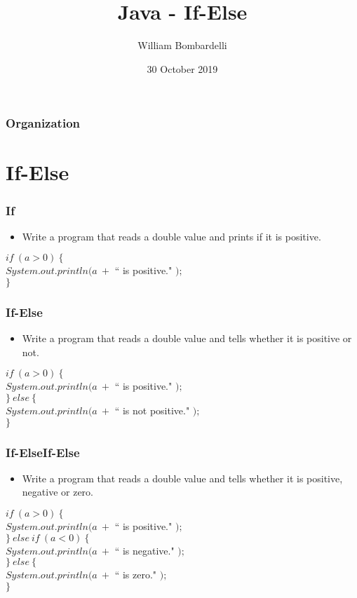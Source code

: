 \documentclass{beamer}
\title[Java]{Java - If-Else}
\author[W. Bombardelli]{William Bombardelli}
\institute[Schweizerschule Mexiko]
{
	\vskip 12pt
	Schweizerschule Mexiko, Ciudad de México, Mexico \\
	\texttt{\url{https://github.com/wbombardellis/java-unterricht}}
}
\date{30 October 2019}
\newcommand{\cindent}{\hskip20pt}
\begin{document}
	\begin{frame}
		\titlepage
	\end{frame}
	
	\begin{frame}
		\frametitle{Organization}
		\tableofcontents
	\end{frame}

	\section{If-Else}
	\begin{frame}
		\frametitle{If}
		\begin{itemize}
			\item Write a program that reads a double value and prints if it is positive.
		\end{itemize}
		\pause
		$if\ (a > 0)\ \{$\\
		\cindent $System.out.println(a\ + $ `` is positive." $);$\\
		$\}$\\
	\end{frame}

	\begin{frame}
		\frametitle{If-Else}
		\begin{itemize}
			\item Write a program that reads a double value and tells whether it is positive or not.
		\end{itemize}
		$if\ (a > 0)\ \{$\\
		\cindent $System.out.println(a\ + $ `` is positive." $);$\\
		$\}\ else\ \{$\\
		\cindent $System.out.println(a\ + $ `` is not positive." $);$\\
		$\}$\\
	\end{frame}

	\begin{frame}
		\frametitle{If-ElseIf-Else}
		\begin{itemize}
			\item Write a program that reads a double value and tells whether it is positive, negative or zero.
		\end{itemize}
		$if\ (a > 0)\ \{$\\
		\cindent $System.out.println(a\ + $ `` is positive." $);$\\
		$\}\ else\ if\ (a < 0) \ \{$\\
		\cindent $System.out.println(a\ + $ `` is negative." $);$\\
		$\}\ else\ \{$\\
		\cindent $System.out.println(a\ + $ `` is zero." $);$\\
		$\}$\\
	\end{frame}
\end{document}
